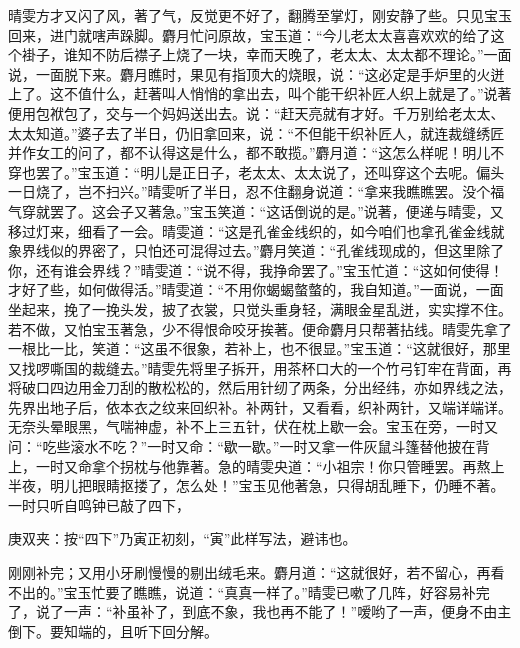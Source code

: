 \begin{parag}
    晴雯方才又闪了风，著了气，反觉更不好了，翻腾至掌灯，刚安静了些。只见宝玉回来，进门就嗐声跺脚。麝月忙问原故，宝玉道：“今儿老太太喜喜欢欢的给了这个褂子，谁知不防后襟子上烧了一块，幸而天晚了，老太太、太太都不理论。”一面说，一面脱下来。麝月瞧时，果见有指顶大的烧眼，说：“这必定是手炉里的火迸上了。这不值什么，赶著叫人悄悄的拿出去，叫个能干织补匠人织上就是了。”说著便用包袱包了，交与一个妈妈送出去。说：“赶天亮就有才好。千万别给老太太、太太知道。”婆子去了半日，仍旧拿回来，说：“不但能干织补匠人，就连裁缝绣匠并作女工的问了，都不认得这是什么，都不敢揽。”麝月道：“这怎么样呢！明儿不穿也罢了。”宝玉道：“明儿是正日子，老太太、太太说了，还叫穿这个去呢。偏头一日烧了，岂不扫兴。”晴雯听了半日，忍不住翻身说道：“拿来我瞧瞧罢。没个福气穿就罢了。这会子又著急。”宝玉笑道：“这话倒说的是。”说著，便递与晴雯，又移过灯来，细看了一会。晴雯道：“这是孔雀金线织的，如今咱们也拿孔雀金线就象界线似的界密了，只怕还可混得过去。”麝月笑道：“孔雀线现成的，但这里除了你，还有谁会界线？”晴雯道：“说不得，我挣命罢了。”宝玉忙道：“这如何使得！才好了些，如何做得活。”晴雯道：“不用你蝎蝎螫螫的，我自知道。”一面说，一面坐起来，挽了一挽头发，披了衣裳，只觉头重身轻，满眼金星乱迸，实实撑不住。若不做，又怕宝玉著急，少不得恨命咬牙挨著。便命麝月只帮著拈线。晴雯先拿了一根比一比，笑道：“这虽不很象，若补上，也不很显。”宝玉道：“这就很好，那里又找啰嘶国的裁缝去。”晴雯先将里子拆开，用茶杯口大的一个竹弓钉牢在背面，再将破口四边用金刀刮的散松松的，然后用针纫了两条，分出经纬，亦如界线之法，先界出地子后，依本衣之纹来回织补。补两针，又看看，织补两针，又端详端详。无奈头晕眼黑，气喘神虚，补不上三五针，伏在枕上歇一会。宝玉在旁，一时又问：“吃些滚水不吃？”一时又命：“歇一歇。”一时又拿一件灰鼠斗篷替他披在背上，一时又命拿个拐枕与他靠著。急的晴雯央道：“小祖宗！你只管睡罢。再熬上半夜，明儿把眼睛抠搂了，怎么处！”宝玉见他著急，只得胡乱睡下，仍睡不著。一时只听自鸣钟已敲了四下，\begin{note}庚双夹：按“四下”乃寅正初刻，“寅”此样写法，避讳也。\end{note}刚刚补完；又用小牙刷慢慢的剔出绒毛来。麝月道：“这就很好，若不留心，再看不出的。”宝玉忙要了瞧瞧，说道：“真真一样了。”晴雯已嗽了几阵，好容易补完了，说了一声：“补虽补了，到底不象，我也再不能了！”嗳哟了一声，便身不由主倒下。要知端的，且听下回分解。
\end{parag}
